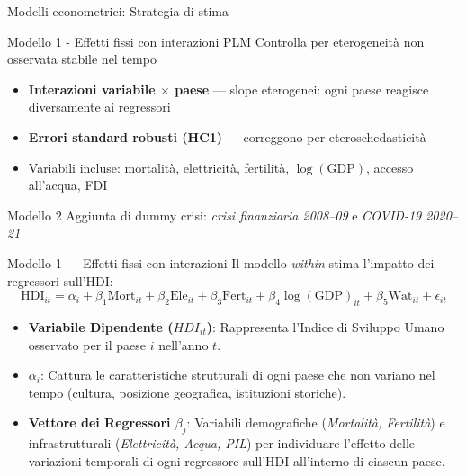 \documentclass[
  ignorenonframetext,
  aspectratio=43,
]{beamer}
\begin{document}
\begin{frame}{Modelli econometrici: Strategia di stima}
\label{modelli-econometrici-strategia-di-stima}
\begin{block}{Modello 1 - Effetti fissi con interazioni PLM}
Controlla per eterogeneità non osservata stabile nel tempo
\end{block}

\vspace{0.4em}

\begin{itemize}
  \item \textbf{Interazioni variabile $\times$ paese} — slope eterogenei: ogni paese reagisce diversamente ai regressori
  \item \textbf{Errori standard robusti (HC1)} — correggono per eteroschedasticità
  \item Variabili incluse: mortalità, elettricità, fertilità, $\log(\text{GDP})$, accesso all'acqua, FDI
\end{itemize}

\vspace{0.4em}

\begin{block}{Modello 2}
Aggiunta di dummy crisi: \textit{crisi finanziaria 2008--09} e \textit{COVID-19 2020--21}
\end{block}
\end{frame}

\begin{frame}{Modello 1 --- Effetti fissi con interazioni}
\label{modello-1-effetti-fissi-con-interazioni}
Il modello \textit{within} stima l'impatto dei regressori sull'HDI: \[
\text{HDI}_{it} = \alpha_i + \beta_1 \text{Mort}_{it} + \beta_2 \text{Ele}_{it} + \beta_3 \text{Fert}_{it} + \beta_4 \log(\text{GDP})_{it} + \beta_5 \text{Wat}_{it} + \epsilon_{it}
\]

\begin{itemize}
  \item \textbf{Variabile Dipendente ($HDI_{it}$)}: Rappresenta l'Indice di Sviluppo Umano osservato per il paese $i$ nell'anno $t$.
  \item $\alpha_i$: Cattura le caratteristiche strutturali di ogni paese che non variano nel tempo (cultura, posizione geografica, istituzioni storiche).
  \item \textbf{Vettore dei Regressori $\beta_j$}: Variabili demografiche (\textit{Mortalità, Fertilità}) e infrastrutturali (\textit{Elettricità, Acqua, PIL}) per individuare l'effetto delle variazioni temporali di ogni regressore sull'HDI all'interno di ciascun paese.
\end{itemize}
\end{frame}
\end{document}
